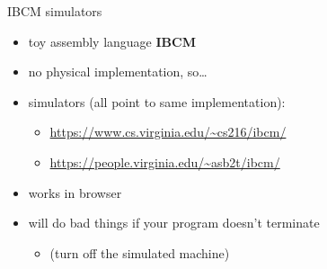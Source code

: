 \begin{frame}{IBCM simulators}
    \begin{itemize}
        \item toy assembly language \textbf{IBCM}
        \item no physical implementation, so\ldots
        \item simulators (all point to same implementation):
            \begin{itemize}
            \item \url{https://www.cs.virginia.edu/~cs216/ibcm/}
            \item \url{https://people.virginia.edu/~asb2t/ibcm/}
            \end{itemize}
        \item works in browser
        \item will do bad things if your program doesn't terminate
                \begin{itemize}
                \item (turn off the simulated machine)
                \end{itemize}
    \end{itemize}
\end{frame}
